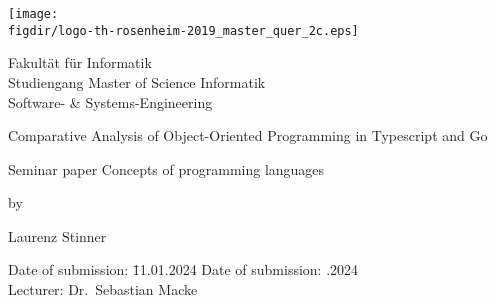 \begin{titlepage}

    \sffamily

    \raggedleft

    \vspace*{-2cm}

    \texttt{[image: \\figdir/logo-th-rosenheim-2019\_master\_quer\_2c.eps]}

    \vfill

    \centering
    \LARGE
    Fakultät für Informatik  \vspace{0.5cm}\\
    \Large
    Studiengang Master of Science Informatik\\
    Software- \& Systems-Engineering

    \vspace{2cm}

    \LARGE

    Comparative Analysis of Object-Oriented Programming in Typescript and Go

    \vspace{2cm}

    \Large
    Seminar paper Concepts of programming languages

    \vspace{1.5cm}


    \Large
    by

    \vspace{0.5cm}


    \LARGE
    Laurenz Stinner \vspace{1cm}

    \vspace{1cm}

    \flushleft
    \Large
    \vspace*{\fill}

    \begin{tabbing}
        Date of submission: \= 11.01.2024 \kill
        Date of submission: .2024 \\
        Lecturer: \> Dr.\ Sebastian Macke
    \end{tabbing}

\end{titlepage}



